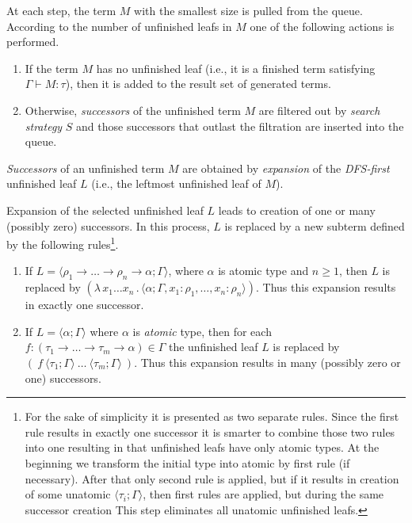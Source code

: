 \documentclass{llncs}
\newcommand{\tur}[3]{#1\vdash{}#2 \colon #3}
\newcommand{\lamb}[2]{( \lambda \, #1 \, . \, #2 )}
\newcommand{\ar}{\rightarrow\xspace}
\newcommand{\ul}[2]{\langle #1 ; #2 \rangle}
\newcommand{\red}[1]{{\color{red} #1}}
\begin{document}
At each step, the term $M$ with the smallest size
is pulled from the queue.
According to the number of unfinished leafs in $M$ one of
the following actions is performed.
\begin{enumerate}
 \item If the term $M$ has no unfinished leaf (i.e., it is a finished
 term satisfying \mbox{$\tur{\Gamma}{M}{\tau}$}), then it is added to the
 result set
 of generated terms.   
 \item Otherwise, \textit{successors} of the unfinished term $M$ are
       filtered out by \textit{search strategy} $S$ and
       those successors that outlast the filtration 
       are inserted into the queue.
\end{enumerate}

\textit{Successors} of an unfinished term $M$ are obtained by 
\textit{expansion} of the \mbox{\textit{DFS-first}} unfinished leaf $L$
(i.e., the leftmost unfinished leaf of $M$).

Expansion of the selected unfinished leaf $L$ leads to creation of 
one or many (possibly zero) successors.
In this process, $L$ is replaced
by a new subterm defined by the following rules\footnote{
For the sake of simplicity it is presented as two separate rules. 
Since the first rule results in exactly one successor it is smarter
to combine those two rules into one resulting in that unfinished leafs
have only atomic types. At the beginning we transform the initial type into atomic by first rule (if necessary). After that
only second rule is applied, but if it results in creation of some unatomic 
$\ul{\tau_i}{\Gamma}$, then first rules are applied, but during the same successor creation This step eliminates all unatomic unfinished leafs. }.
\begin{enumerate}
 \item If $L = \ul{\rho_1 \ar \dots \ar \rho_n \ar \alpha}{\Gamma}$,
 	   where $\alpha$ is atomic type and $n \geq 1$, 
       then $L$ is replaced by 
       $\lamb{x_1 \dots x_n}{\ul{\alpha}
       {\Gamma,x_1 \colon \rho_1,\dots,x_n \colon \rho_n}}$.
       Thus this expansion results in exactly one successor.  
 \item If $L = \ul{\alpha}{\Gamma}$ where $\alpha$ is \textit{atomic} type,
       then for each 
       \mbox{$f : (\tau_1 \ar \dots \ar \tau_m \ar \alpha) \in \Gamma$}
       the unfinished leaf $L$ is replaced by 
       $(~f~\ul{\tau_1}{\Gamma}~\dots~\ul{\tau_m}{\Gamma}~)$.
       Thus this expansion results in many (possibly zero or one) successors.
\end{enumerate}
\end{document}
